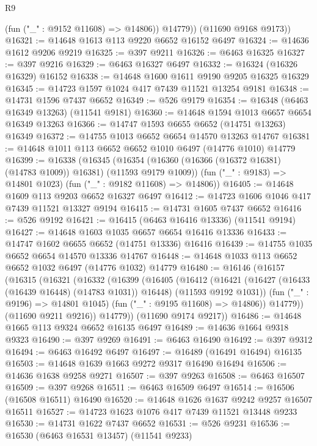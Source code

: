 \begin{lexlean}{R9}
\begin{coremodule}
            (fun ("_" : @9152 @11608) => @14806))
          @14779))
      (@11690 @9168 @9173))
@16321 := @14648 @1613 @113 @9220 @6652 @16152 @6497
@16324 := @14636 @1612 @9206 @9219
@16325 := @397 @9211
@16326 := @6463 @16325
@16327 := @397 @9216
@16329 := @6463 @16327 @6497
@16332 := @16324 (@16326 @16329) @16152
@16338 := @14648 @1600 @1611 @9190 @9205 @16325 @16329
@16345 := @14723 @1597 @1024 @417 @7439 @11521 @13254 @9181
@16348 := @14731 @1596 @7437 @6652
@16349 := @526 @9179
@16354 := @16348 (@6463 @16349 @13263) (@11541 @9181)
@16360 := @14648 @1594 @1013 @6657 @6654 @16349 @13263
@16366 := @14747 @1593 @6655 @6652 (@14751 @13263) @16349
@16372 := @14755 @1013 @6652 @6654 @14570 @13263 @14767
@16381 := @14648 @1011 @113 @6652 @6652 @1010 @6497 (@14776 @1010) @14779
@16399 := @16338
    (@16345
      (@16354 (@16360 (@16366 (@16372 @16381) (@14783 @1009)) @16381) (@11593 @9179 @1009))
      (fun ("_" : @9183) => @14801 @1023)
      (fun ("_" : @9182 @11608) => @14806))
@16405 := @14648 @1609 @113 @9203 @6652 @16327 @6497
@16412 := @14723 @1606 @1046 @417 @7439 @11521 @13327 @9194
@16415 := @14731 @1605 @7437 @6652
@16416 := @526 @9192
@16421 := @16415 (@6463 @16416 @13336) (@11541 @9194)
@16427 := @14648 @1603 @1035 @6657 @6654 @16416 @13336
@16433 := @14747 @1602 @6655 @6652 (@14751 @13336) @16416
@16439 := @14755 @1035 @6652 @6654 @14570 @13336 @14767
@16448 := @14648 @1033 @113 @6652 @6652 @1032 @6497 (@14776 @1032) @14779
@16480 := @16146
    (@16157
      (@16315
        (@16321
          (@16332
            (@16399
              (@16405
                (@16412
                  (@16421
                    (@16427 (@16433 (@16439 @16448) (@14783 @1031)) @16448)
                    (@11593 @9192 @1031))
                  (fun ("_" : @9196) => @14801 @1045)
                  (fun ("_" : @9195 @11608) => @14806))
                @14779))
            (@11690 @9211 @9216))
          @14779))
      (@11690 @9174 @9217))
@16486 := @14648 @1665 @113 @9324 @6652 @16135 @6497
@16489 := @14636 @1664 @9318 @9323
@16490 := @397 @9269
@16491 := @6463 @16490
@16492 := @397 @9312
@16494 := @6463 @16492 @6497
@16497 := @16489 (@16491 @16494) @16135
@16503 := @14648 @1639 @1663 @9272 @9317 @16490 @16494
@16506 := @14636 @1638 @9258 @9271
@16507 := @397 @9263
@16508 := @6463 @16507
@16509 := @397 @9268
@16511 := @6463 @16509 @6497
@16514 := @16506 (@16508 @16511) @16490
@16520 := @14648 @1626 @1637 @9242 @9257 @16507 @16511
@16527 := @14723 @1623 @1076 @417 @7439 @11521 @13448 @9233
@16530 := @14731 @1622 @7437 @6652
@16531 := @526 @9231
@16536 := @16530 (@6463 @16531 @13457) (@11541 @9233)

\end{coremodule}
\end{lexlean}
